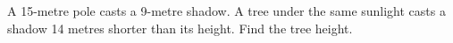 A 15-metre pole casts a 9-metre shadow. A tree under the same sunlight casts a shadow 14 metres shorter than its height. Find the tree height.

